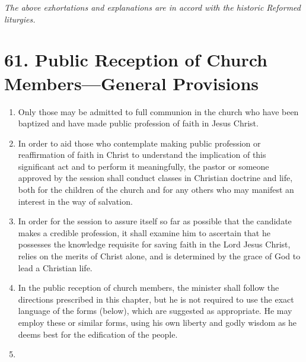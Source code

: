 \documentclass[
]{book}
\providecommand{\tightlist}{%
  \setlength{\itemsep}{0pt}\setlength{\parskip}{0pt}}
\begin{document}
\emph{The above exhortations and explanations are in accord with the historic Reformed liturgies.}

\hypertarget{public-reception-of-church-membersgeneral-provisions}{%
\section*{61. Public Reception of Church Members---General Provisions}\label{public-reception-of-church-membersgeneral-provisions}}

\protect\hypertarget{chapter-slug-61-public-reception-of-church-members-general-provisions}{\href{}{}}

\begin{enumerate}
\def\labelenumi{\arabic{enumi}.}
\tightlist
\item
  \protect\hypertarget{61}{\href{}{}}Only those may be admitted to full communion in the church who have been baptized and have made public profession of faith in Jesus Christ.
\item
  In order to aid those who contemplate making public profession or reaffirmation of faith in Christ to understand the implication of this significant act and to perform it meaningfully, the pastor or someone approved by the session shall conduct classes in Christian doctrine and life, both for the children of the church and for any others who may manifest an interest in the way of salvation.
\item
  \protect\hypertarget{61.3}{\href{}{}}In order for the session to assure itself so far as possible that the candidate makes a credible profession, it shall examine him to ascertain that he possesses the knowledge requisite for saving faith in the Lord Jesus Christ, relies on the merits of Christ alone, and is determined by the grace of God to lead a Christian life.
\item
  In the public reception of church members, the minister shall follow the directions prescribed in this chapter, but he is not required to use the exact language of the forms (below), which are suggested as appropriate. He may employ these or similar forms, using his own liberty and godly wisdom as he deems best for the edification of the people.
\item

\end{enumerate}
\end{document}

